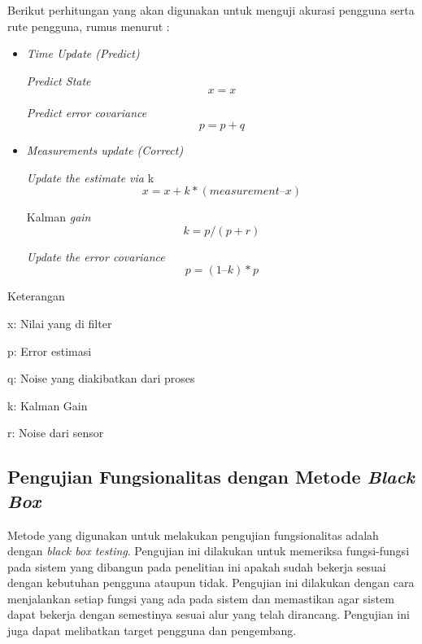 \newpage
Berikut perhitungan yang akan digunakan untuk menguji akurasi pengguna serta rute pengguna, rumus menurut \citep{ihsan2018analisis}:
\begin{itemize}
\item \textit{Time Update (Predict)}

\par \textit{Predict State}
\begin{equation}
x = x
\end{equation}

\par \textit{Predict error covariance}
\begin{equation}
p = p + q
\end{equation}

\item \textit{Measurements update (Correct)}
\par \textit{Update the estimate via} k 
\begin{equation}
x = x + k*(measurement – x)
\end{equation}

\par Kalman \textit{gain} 
\begin{equation}
k = p / ( p+r )
\end{equation}

\par \textit{Update the error covariance}
\begin{equation}
p = (1 – k )* p
\end{equation}

\end{itemize}
\par Keterangan
\par x: Nilai yang di filter
\par p: Error estimasi
\par q: Noise yang diakibatkan dari proses
\par k: Kalman Gain
\par r: Noise dari sensor\newline

\subsection{Pengujian Fungsionalitas dengan Metode \textit{Black Box}}
Metode yang digunakan untuk melakukan pengujian fungsionalitas adalah dengan \textit{black box testing}. Pengujian ini dilakukan untuk memeriksa fungsi-fungsi pada sistem yang dibangun pada penelitian ini apakah sudah bekerja sesuai dengan kebutuhan pengguna ataupun tidak. Pengujian ini dilakukan dengan cara menjalankan setiap fungsi yang ada pada sistem dan memastikan agar sistem dapat bekerja dengan semestinya sesuai alur yang telah dirancang. Pengujian ini juga dapat melibatkan target pengguna dan pengembang.

